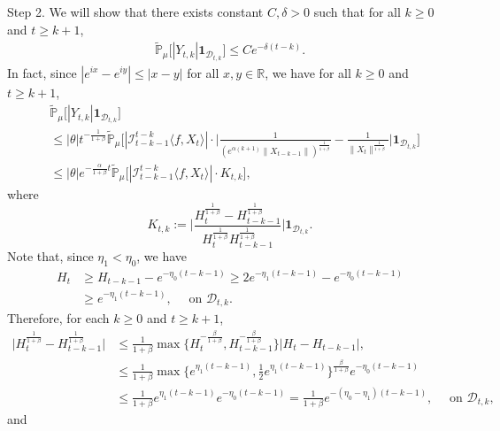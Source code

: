 \documentclass[12pt]{amsart}
\theoremstyle{plain}
\theoremstyle{definition}
\numberwithin{equation}{section}
\begin{document}
    Step 2. We will show that there exists constant $C,\delta > 0$ such that for all $k\geq 0$ and $t\geq k+1$,
\begin{align}
\label{thm122}
     \mathbb{\tilde{P}}_{\mu}\big[|Y_{t,k}|\mathbf{1}_{\mathcal{D}_{t,k}}\big]
     \leq  C e^{-\delta (t-k)}.
\end{align}
    In fact, since $|e^{ix}-e^{iy}|\leq|x-y|$ for all $x,y\in \mathbb R$, we have for all $k \geq 0$ and $t\geq k+1$,
\begin{align}
\label{eq: control of Ykt}
        &\mathbb{\tilde{P}}_{\mu}\big[|Y_{t,k}|\mathbf{1}_{\mathcal{D}_{t,k}}\big]
        \\&\leq|\theta|t^{-\frac{1}{1+\beta}} \mathbb{\tilde{P}}_{\mu}\bigg[|\mathcal I_{t-k-1}^{t-k}\langle f ,X_t\rangle|\cdot\Big|\frac{1}{(e^{\alpha(k+1)}\|X_{t-k-1}\|)^{\frac{1}{1+\beta}}}-\frac{1}{\|X_t\|^{\frac{1}{1+\beta}}}\Big|\mathbf{1}_{\mathcal{D}_{t,k}}\bigg]
        \\&\leq |\theta| e^{-\frac{\alpha}{1+\beta}t}\mathbb{\tilde{P}}_{\mu}\big[|\mathcal I_{t-k-1}^{t-k}\langle f ,X_t\rangle|\cdot K_{t,k}\big],
\end{align}
    where
\begin{equation}
\label{def: Ktk}
    K_{t,k}
    :=\Big|\frac{H_t^{\frac{1}{1+\beta}}-H_{t-k-1}^{\frac{1}{1+\beta}}}{H_t^{\frac{1}{1+\beta}}H_{t-k-1}^{\frac{1}{1+\beta}}}\Big|\mathbf{1}_{\mathcal{D}_{t,k}}.
\end{equation}
    Note that, since $\eta_1 < \eta_0$, we have
\begin{align*}
    H_t
    &\geq H_{t-k-1}- e^{-\eta_0(t-k-1)}
    \geq 2e^{-\eta_1(t-k-1)}-e^{-\eta_0(t-k-1)}
    \\&\geq e^{-\eta_1(t-k-1)},
    \quad \text{ on } \mathcal D_{t,k}.
\end{align*}
    Therefore, for each $k \geq 0$ and $t\geq k+1$,
\begin{align*}
     \Big|H_t^{\frac{1}{1+\beta}}-H_{t-k-1}^{\frac{1}{1+\beta}}\Big|
     &\leq \frac{1}{1+\beta}\max \Big\{H_t^{-\frac{\beta}{1+\beta}},H_{t-k-1}^{-\frac{\beta}{1+\beta}}\Big\}\left|H_t-H_{t-k-1}\right|,
    \\&\leq \frac{1}{1+\beta} \max\{e^{\eta_1 (t-k-1)}, \frac{1}{2}e^{\eta_1(t-k-1)}\}^{\frac{\beta}{1+\beta}}e^{-\eta_0(t-k-1)}
    \\&\leq \frac{1}{1+\beta} e^{\eta_1 (t-k-1)} e^{-\eta_0(t-k-1)}
    =\frac{1}{1+\beta}  e^{-(\eta_0 - \eta_1)(t-k-1)},
    \quad \text{ on } \mathcal D_{t,k}, 
\end{align*}
    and
\end{document}
